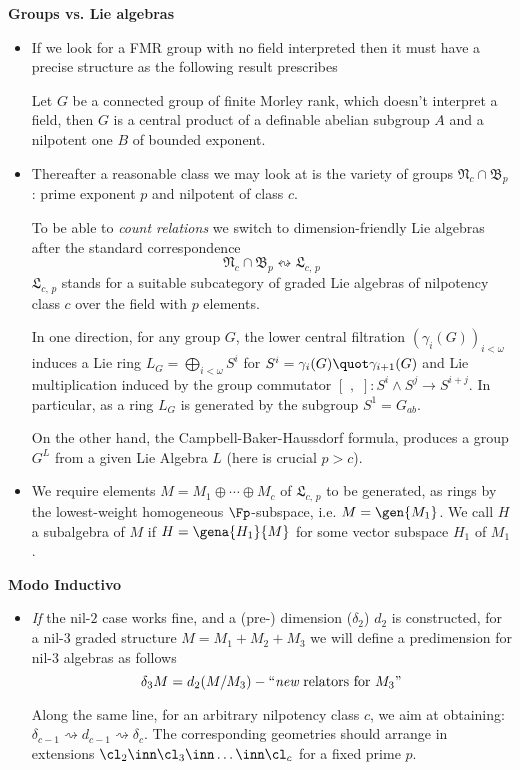 \documentclass[a4paper,11pt,german,english]{report}
\begin{document}
\indent
{\bf Groups vs. Lie algebras}
\begin{itemize}
\item[]If we look for a FMR group with no field interpreted
then it must have a precise structure as the following result prescribes
\begin{teo*}
Let $G$ be a connected group of finite Morley rank, which doesn't interpret a field,
then $G$ is a central product of a definable abelian subgroup $A$ and
a nilpotent one $B$ of bounded exponent.
\end{teo*}
\item[]Thereafter a reasonable class we may look at is the variety of groups $\mathfrak{N}_{c}
\cap\mathfrak{B}_{p}$: prime exponent $p$ and nilpotent of class $c$.

To be able to {\em count relations} we switch to dimension-friendly Lie algebras
after the standard correspondence
$$\mathfrak{N}_{c}\cap\mathfrak{B}_{p}\leftrightsquigarrow
\mathfrak{L}_{c,\,p}$$
$\mathfrak{L}_{c,\,p}$ stands for a suitable subcategory of graded Lie algebras of nilpotency class 
$c$ over the field with $p$ elements.

In one direction, for  any group $G$, the lower central filtration $(\gamma_{i}(G))_{i<\omega}$ induces a Lie ring $L_{G}=\bigoplus_{i<\omega}S^{i}$ for $S^{i}=\gamma_{i}(G)\quot\gamma_{i+1}(G)$
and Lie multiplication induced by the group commutator $[\,\,,\,\,]\colon S^{i}\wedge S^{j}\rightarrow S^{i+j}$.
In particular, as a ring $L_{G}$ is generated by the subgroup $S^{1}=G_{ab}$.

On the other hand, the Campbell-Baker-Haussdorf formula, produces a group $G^{L}$ from a given Lie Algebra $L$ (here is crucial $p>c$).

\item[]We require elements $M=M_{1}\oplus\cdots\oplus M_{c}$ of $\mathfrak{L}_{c,\,p}$
to be generated, as rings by the lowest-weight homogeneous $\Fp$-subspace, i.{}e. $M=\gen{M_{1}}$. We call $H$ a subalgebra of $M$ if $H=\gena{H_{1}}{M}$
for some vector subspace $H_{1}$ of $M_{1}$.
\end{itemize}

\indent
{\bf Modo Inductivo}
\begin{itemize}
\item[]{\em If} the nil-$2$ case works fine, and a (pre-) dimension ($\delta_{2}$) $d_{2}$ is constructed, for a nil-$3$ graded structure $M=M_{1}+M_{2}+M_{3}$ we will define a predimension for nil-$3$ algebras as
follows $$\delta_{3}M=d_{2}(M/M_{3})-\text{``{\em new} relators for $M_{3}$''}$$


Along the same line, for an arbitrary nilpotency class $c$,
we aim at obtaining: $\delta_{c-1}\rightsquigarrow d_{c-1}\rightsquigarrow\delta_{c}$. The corresponding geometries should arrange in extensions $\cl_{2}\inn\cl_{3}\inn\dots\inn\cl_{c}%
$ for a fixed prime $p$.
\end{itemize}
\end{document}
